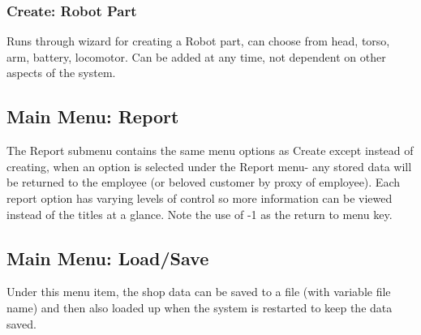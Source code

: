 \documentclass{article}
\begin{document}
\subsubsection{Create: Robot Part}
Runs through wizard for creating a Robot part, can choose from head, torso, arm, battery, locomotor.
Can be added at any time, not dependent on other aspects of the system.
\subsection{Main Menu: Report}
The Report submenu contains the same menu options as Create except instead of creating, when an option is selected under the Report menu- any stored data will be returned to the employee (or beloved customer by proxy of employee). Each report option has varying levels of control so more information can be viewed instead of the titles at a glance. Note the use of -1 as the return to menu key.
\subsection{Main Menu: Load/Save}
Under this menu item, the shop data can be saved to a file (with variable file name) and then also loaded up when the system is restarted to keep the data saved. 
\end{document}
